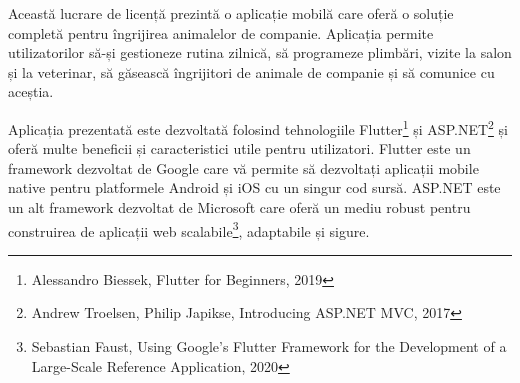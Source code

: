 Această lucrare de licență prezintă o aplicație mobilă care oferă o soluție completă pentru îngrijirea animalelor de companie. Aplicația permite utilizatorilor să-și gestioneze rutina zilnică, să programeze plimbări, vizite la salon și la veterinar, să găsească îngrijitori de animale de companie și să comunice cu aceștia.


Aplicația prezentată este dezvoltată folosind tehnologiile Flutter\footnote{Alessandro Biessek, Flutter for Beginners, 2019} și ASP.NET\footnote{Andrew Troelsen, Philip Japikse, Introducing ASP.NET MVC, 2017} și oferă multe beneficii și caracteristici utile pentru utilizatori. Flutter este un framework dezvoltat de Google care vă permite să dezvoltați aplicații mobile native pentru platformele Android și iOS cu un singur cod sursă. ASP.NET este un alt framework dezvoltat de Microsoft care oferă un mediu robust pentru construirea de aplicații web scalabile\footnote{Sebastian Faust, Using Google's Flutter Framework for the Development of a Large-Scale Reference Application, 2020}, adaptabile și sigure.